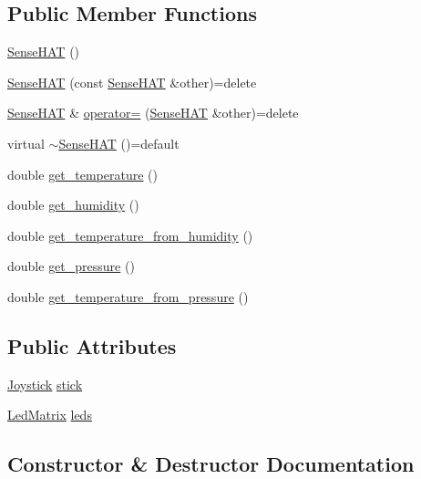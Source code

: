 \subsection*{Public Member Functions}
\begin{DoxyCompactItemize}
\item 
\hyperlink{class_sense_h_a_t_a6f1b370e30d524ee6bccaa19c5566fbe}{Sense\+H\+AT} ()
\item 
\hyperlink{class_sense_h_a_t_a39f7095d97dd434479c05e85bdc32952}{Sense\+H\+AT} (const \hyperlink{class_sense_h_a_t}{Sense\+H\+AT} \&other)=delete
\item 
\hyperlink{class_sense_h_a_t}{Sense\+H\+AT} \& \hyperlink{class_sense_h_a_t_aa05efe7c4e0933067e3b655470dfd6df}{operator=} (\hyperlink{class_sense_h_a_t}{Sense\+H\+AT} \&other)=delete
\item 
virtual \hyperlink{class_sense_h_a_t_a1af79051ee9d294203278d8d3f22036a}{$\sim$\+Sense\+H\+AT} ()=default
\item 
double \hyperlink{class_sense_h_a_t_ae0d2f1c110a5dfe453bdb2f22cf719c0}{get\+\_\+temperature} ()
\item 
double \hyperlink{class_sense_h_a_t_a270dbefc2b736c1ef3dfc996f968611f}{get\+\_\+humidity} ()
\item 
double \hyperlink{class_sense_h_a_t_af1ffda111c9826f7eb3b88aa0ea29a00}{get\+\_\+temperature\+\_\+from\+\_\+humidity} ()
\item 
double \hyperlink{class_sense_h_a_t_a6fcb3739537d351a60375a8aa8309a4e}{get\+\_\+pressure} ()
\item 
double \hyperlink{class_sense_h_a_t_abe8f9a29726dbfeac2bd45cff6f8a984}{get\+\_\+temperature\+\_\+from\+\_\+pressure} ()
\end{DoxyCompactItemize}
\subsection*{Public Attributes}
\begin{DoxyCompactItemize}
\item 
\hyperlink{class_joystick}{Joystick} \hyperlink{class_sense_h_a_t_a69d5712bf0663364109f9a482178dc2c}{stick}
\item 
\hyperlink{class_led_matrix}{Led\+Matrix} \hyperlink{class_sense_h_a_t_a09557e42b20ddddc1763917bd36f36a7}{leds}
\end{DoxyCompactItemize}


\subsection{Constructor \& Destructor Documentation}
